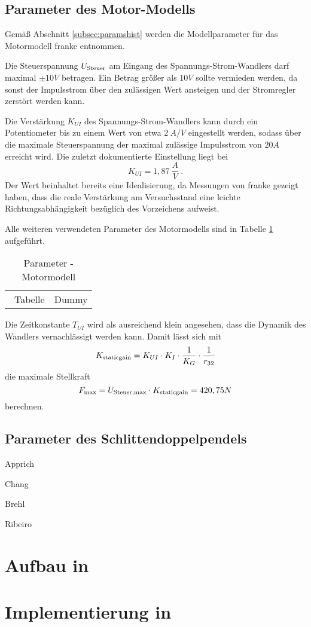 \subsection{Parameter des Motor-Modells}\label{subsec:motorparams}

Gemäß Abschnitt \ref{subsec:paramshist} werden die Modellparameter für das Motormodell franke \cite{franke} entnommen. 

Die Steuerspannung $U_{\mathrm{Steuer}}$ am Eingang des Spannungs-Strom-Wandlers darf maximal $\pm10 V$ betragen. Ein Betrag größer als $10 V$ sollte vermieden werden, da sonst der Impulsstrom über den zulässigen Wert ansteigen und der Stromregler zerstört werden kann.

Die Verstärkung $K_{UI}$ des Spannungs-Strom-Wandlers kann durch ein Potentiometer bis zu einem Wert von etwa $2 \ A/V$ eingestellt werden, sodass über die maximale Steuerspannung der maximal zulässige Impulsstrom von $20A$ erreicht wird. Die zuletzt dokumentierte Einstellung liegt bei
\[
	K_{UI} = 1,87 \ \frac{A}{V} \ .
\]
Der Wert beinhaltet bereits eine Idealisierung, da Messungen von franke \cite{franke} gezeigt haben, dass die reale Verstärkung am Versuchsstand eine leichte Richtungsabhängigkeit bezüglich des Vorzeichens aufweist.

Alle weiteren verwendeten Parameter des Motormodells sind in Tabelle \ref{tab:motorparams} aufgeführt.

\begin{table}[h]
	\centering
		\begin{tabular}[t]{cc} \
					Tabelle & Dummy \\
		\end{tabular}
	\caption{Parameter - Motormodell}
	\label{tab:motorparams}
\end{table}

Die Zeitkonstante $T_{UI}$ wird als ausreichend klein angesehen, dass die Dynamik des Wandlers vernachlässigt werden kann.
Damit lässt sich mit
\[
	K_{\mathrm{staticgain}} = K_{UI} \cdot K_I \cdot \frac{1}{K_G} \cdot \frac{1}{r_{32}}
\]
 die maximale Stellkraft
\[
	F_{\mathrm{max}} = U_{\mathrm{Steuer, max}} \cdot K_{\mathrm{staticgain}} = 420,75 N
\]
berechnen. 

\subsection{Parameter des Schlittendoppelpendels}\label{subsec:spdparams}



Apprich \cite{apprich}

Chang \cite{chang}

Brehl \cite{brehl}

Ribeiro \cite{ribeiro}


\section{Aufbau in \Simulink}



\section{Implementierung in \Matlab}